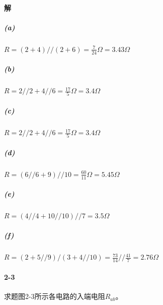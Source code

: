 \documentclass[hyperref, UTF8]{ctexart}
\begin{document}
\paragraph{解}
\subparagraph{(a)}
$R = (2+4)//(2+6)=\frac{7}{24}\Omega=3.43\Omega$
\subparagraph{(b)}
$R=2//2+4//6=\frac{17}{5}\Omega=3.4\Omega$
\subparagraph{(c)}
$R=2//2+4//6=\frac{17}{5}\Omega=3.4\Omega$
\subparagraph{(d)}
$R=(6//6+9)//10=\frac{60}{11}\Omega=5.45\Omega$
\subparagraph{(e)}
$R=(4//4+10//10)//7=3.5\Omega$
\subparagraph{(f)}
$R=(2+5//9)/(3+4//10)=\frac{73}{14}//\frac{41}{7}=2.76\Omega$

\paragraph{2-3} \label{2-3}
求题图2-3所示各电路的入端电阻$R_{ab}$。
\end{document}
